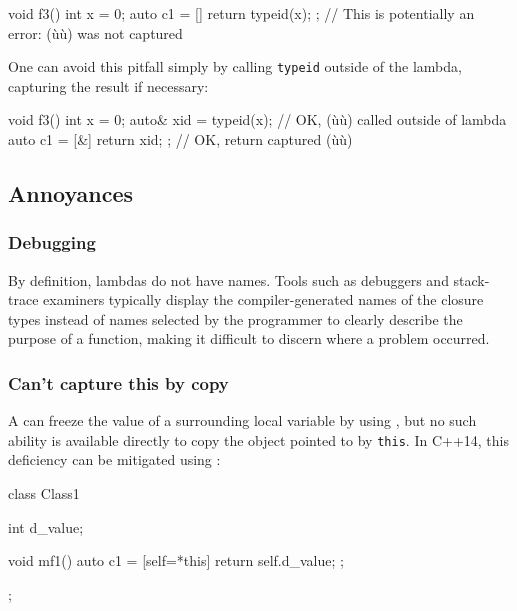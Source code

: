 \begin{emcppslisting}
void f3()
{
    int x = 0;
    auto c1 = []{ return typeid(x); };
        // This is potentially an error: (ù{}ù) was not captured
}
\end{emcppslisting}
    

One can avoid this pitfall simply by calling \lstinline!typeid! outside of
the lambda, capturing the result if necessary:

\begin{emcppslisting}
void f3()
{
    int x = 0;
    auto& xid = typeid(x);         // OK, (ù{}ù) called outside of lambda
    auto c1 = [&]{ return xid; };  // OK, return captured (ù{}ù)
}
\end{emcppslisting}
    

\subsection[Annoyances]{Annoyances}\label{annoyances}

\subsubsection[Debugging]{Debugging}\label{debugging}

By definition, lambdas do not have names. Tools such as debuggers and
stack-trace examiners typically display the compiler-generated names of
the closure types instead of names selected by the programmer to clearly
describe the purpose of a function, making it difficult to discern where
a problem occurred.

\subsubsection[Can’t capture \lstinline!*this! by copy]{Can’t capture {\SubsubsecCode *this} by copy}\label{can’t-capture-*this-by-copy}

A  can freeze the value of a surrounding local
variable by using , but no such ability is
available directly to copy the object pointed to by \lstinline!this!. In
C++14, this deficiency can be mitigated using :

\begin{emcppslisting}
class Class1
{
    int d_value;

    void mf1()
    {
        auto c1 = [self=*this]{ return self.d_value; };
    }
};
\end{emcppslisting}
    


